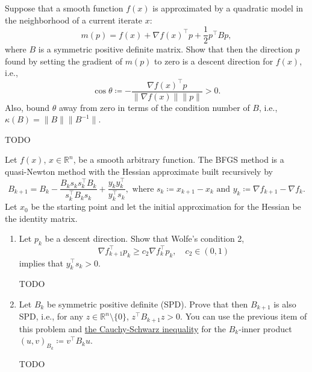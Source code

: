 \documentclass{../kin_math}
\begin{document}
\begin{questions}
  \question Suppose that a smooth function $f(x)$ is approximated by a quadratic model in the neighborhood of a current iterate $x$:
  \begin{equation*}
    m(p) = f(x) + \nabla f(x)^\top p + \frac{1}{2} p^\top B p,
  \end{equation*}
  where $B$ is a symmetric positive definite matrix. Show that then the direction $p$ found by setting the gradient of $m(p)$ to zero is a descent direction for $f(x)$, i.e.,
  \begin{equation*}
    \cos \theta \coloneqq - \frac{\nabla f(x)^\top p}{\lVert \nabla f(x) \rVert \lVert p \rVert} > 0.
  \end{equation*}
  Also, bound $\theta$ away from zero in terms of the condition number of $B$, i.e., $\kappa(B) = \lVert B \rVert \lVert B^{-1} \rVert$.
  \begin{solution}
    TODO
  \end{solution}

  \question Let $f(x)$, $x \in \mathbb{R}^n$, be a smooth arbitrary function. The BFGS method is a quasi-Newton method with the Hessian approximate built recursively by
  \begin{equation*}
    B_{k + 1} = B_k - \frac{B_k s_k s_k^\top B_k}{s_k^\top B_k s_k} + \frac{y_k y_k^\top}{y_k^\top s_k}, \text{ where } s_k \coloneqq x_{k + 1} - x_k \text{ and } y_k \coloneqq \nabla f_{k + 1} - \nabla f_k.
  \end{equation*}
  Let $x_0$ be the starting point and let the initial approximation for the Hessian be the identity matrix.
  \begin{enumerate}
    \item Let $p_k$ be a descent direction. Show that Wolfe's condition 2,
    \begin{equation*}
      \nabla f_{k + 1}^\top p_k \geq c_2 \nabla f_k^\top p_k, \quad c_2 \in (0, 1)
    \end{equation*}
    implies that $y_k^\top s_k > 0$.
    \begin{solution}
      TODO
    \end{solution}
    \item Let $B_k$ be symmetric positive definite (SPD). Prove that then $B_{k + 1}$ is also SPD, i.e., for any $z \in \mathbb{R}^n \setminus \{0\}$, $z^\top B_{k + 1} z > 0$. You can use the previous item of this problem and \href{https://en.wikipedia.org/wiki/Cauchy%E2%80%93Schwarz_inequality}{the Cauchy-Schwarz inequality} for the $B_k$-inner product $(u, v)_{B_k} \coloneqq v^\top B_k u$.
    \begin{solution}
      TODO
    \end{solution}
  \end{enumerate}


\end{questions}
\end{document}
